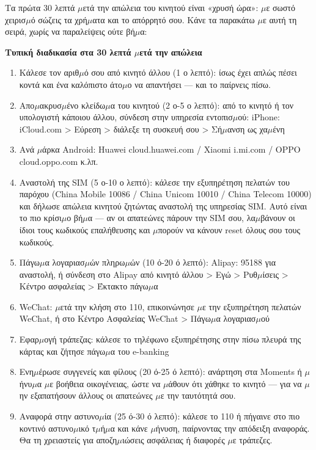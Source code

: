 
Τα πρώτα 30 λεπτά $\mu$ετά την απώλεια του κινητού είναι «χρυσή ώρα»: $\mu$ε σωστό χειρισ$\mu$ό σώζεις τα χρή$\mu$ατα και το απόρρητό σου. Κάνε τα παρακάτω $\mu$ε αυτή τη σειρά, χωρίς να παραλείψεις ούτε βή$\mu$α:

\textbf{Τυπική διαδικασία στα 30 λεπτά $\mu$ετά την απώλεια}\par

\begin{enumerate}
  \item Κάλεσε τον αριθ$\mu$ό σου από κινητό άλλου (1 ο λεπτό): ίσως έχει απλώς πέσει κοντά και ένα καλόπιστο άτο$\mu$ο να απαντήσει — και το παίρνεις πίσω.
  \item Απο$\mu$ακρυσ$\mu$ένο κλείδω$\mu$α του κινητού (2 ο-5 ο λεπτό): από το κινητό ή τον υπολογιστή κάποιου άλλου, σύνδεση στην υπηρεσία εντοπισ$\mu$ού: iPhone: iCloud.com > Εύρεση > διάλεξε τη συσκευή σου > Σή$\mu$ανση ως χα$\mu$ένη
  \item Ανά $\mu$άρκα Android: Huawei cloud.huawei.com / Xiaomi i.mi.com / OPPO cloud.oppo.com κ.λπ.
  \item Αναστολή της SIM (5 ο-10 ο λεπτό): κάλεσε την εξυπηρέτηση πελατών του παρόχου (China Mobile 10086 / China Unicom 10010 / China Telecom 10000) και δήλωσε απώλεια κινητού ζητώντας αναστολή της υπηρεσίας SIM. Αυτό είναι το πιο κρίσι$\mu$ο βή$\mu$α — αν οι απατεώνες πάρουν την SIM σου, λα$\mu$βάνουν οι ίδιοι τους κωδικούς επαλήθευσης και $\mu$πορούν να κάνουν reset όλους σου τους κωδικούς.
  \item Πάγω$\mu$α λογαριασ$\mu$ών πληρω$\mu$ών (10 ό-20 ό λεπτό): Alipay: 95188 για αναστολή, ή σύνδεση στο Alipay από κινητό άλλου > Εγώ > Ρυθ$\mu$ίσεις > Κέντρο ασφαλείας > Έκτακτο πάγω$\mu$α
  \item WeChat: $\mu$ετά την κλήση στο 110, επικοινώνησε $\mu$ε την εξυπηρέτηση πελατών WeChat, ή στο Κέντρο Ασφαλείας WeChat > Πάγω$\mu$α λογαριασ$\mu$ού
  \item Εφαρ$\mu$ογή τράπεζας: κάλεσε το τηλέφωνο εξυπηρέτησης στην πίσω πλευρά της κάρτας και ζήτησε πάγω$\mu$α του e-banking
  \item Ενη$\mu$έρωσε συγγενείς και φίλους (20 ό-25 ό λεπτό): ανάρτηση στα Moments ή $\mu$ήνυ$\mu$α $\mu$ε βοήθεια οικογένειας, ώστε να $\mu$άθουν ότι χάθηκε το κινητό — για να $\mu$ην εξαπατήσουν άλλους οι απατεώνες $\mu$ε την ταυτότητά σου.
  \item Αναφορά στην αστυνο$\mu$ία (25 ό-30 ό λεπτό): κάλεσε το 110 ή πήγαινε στο πιο κοντινό αστυνο$\mu$ικό τ$\mu$ή$\mu$α και κάνε $\mu$ήνυση, παίρνοντας την απόδειξη αναφοράς. Θα τη χρειαστείς για αποζη$\mu$ιώσεις ασφάλειας ή διαφορές $\mu$ε τράπεζες.
\end{enumerate}

